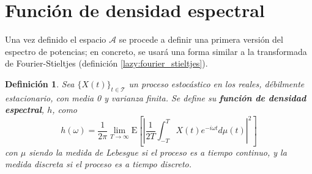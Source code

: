 \documentclass[12pt,letterpaper]{book}
\newtheorem{definicion}{Definición}[chapter]
\newcommand{\E}[1]{\mathrm{E}\left[ #1 \right]}
\newcommand{\abso}[1]{\left| #1 \right|}
\newcommand{\xt}{$\{X(t)\}_{t\in \mathcal{T}}$ }
\begin{document}

\section{Función de densidad espectral}
\label{sec:fde}

Una vez definido el espacio $\mathcal{A}$ se procede a definir una primera versión del espectro de potencias; en concreto, se usará una forma similar a la transformada de Fourier-Stieltjes (definición \ref{lazy:fourier_stieltjes}).

\begin{definicion}%
Sea \xt un proceso estocástico en los reales, débilmente estacionario, con media 0 y varianza finita. Se define su \textbf{función de densidad espectral}, $h$, como
\begin{equation}
h(\omega) = \frac{1}{2 \pi} \lim_{T\rightarrow \infty} \E{ \abso{ \frac{1}{2T} \int_{-T}^{T} X(t) e^{-i \omega t} d\mu(t)}^{2} }
\end{equation}
con $\mu$ siendo la medida de Lebesgue si el proceso es a tiempo continuo, y la medida discreta si el proceso es a tiempo discreto.
\label{txt_FDE_cont}
\end{definicion}
\end{document}
